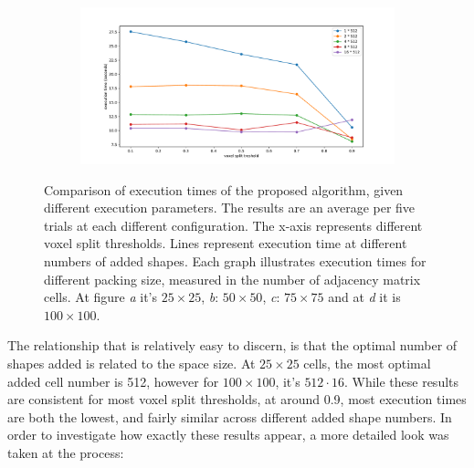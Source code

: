 \documentclass[12pt, oneside]{report}
\begin{document}
\begin{figure}[H]
\begin{subfigure}[b]{0.5\linewidth}
	\caption{}
	\label{summary_res75}
\end{subfigure}
\begin{subfigure}[b]{0.5\linewidth}
  \centering
	\includegraphics[width=\linewidth,keepaspectratio]{Images/SummaryOptimisation/results_100.pdf}
	\caption{}
	\label{summary_res100}
\end{subfigure}
\caption{Comparison of execution times of the proposed algorithm, given different execution parameters. The results are an average per five trials at each different configuration. The x-axis represents different voxel split thresholds. Lines represent execution time at different numbers of added shapes. \newline
Each graph illustrates execution times for different packing size, measured in the number of adjacency matrix cells. At figure \textit{a} it's $25 \times 25$, \textit{b}: $50 \times 50$, \textit{c}: $75 \times 75$ and at \textit{d} it is $100 \times 100$.}

\end{figure}

The relationship that is relatively easy to discern, is that the optimal number of shapes added is related to the space size. At $25 \times 25$ cells, the most optimal added cell number is 512, however for $100 \times 100$, it's $512 \cdot 16$. While these results are consistent for most voxel split thresholds, at around 0.9, most execution times are both the lowest, and fairly similar across different added shape numbers. In order to investigate how exactly these results appear, a more detailed look was taken at the process:
\end{document}
